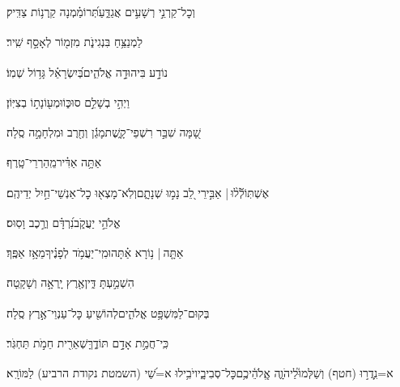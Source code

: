 \documentclass[12pt]{article}
\newcommand{\loc}[1]{\textsuperscript{\locf{#1}}}
\begin{document}
{\loc{ יא}~}‏וְכׇל־קַרְנֵ֣י רְשָׁעִ֣ים אֲגַדֵּ֑עַ{\hfill}תְּ֝רוֹמַ֗מְנָה קַֽרְנ֥וֹת צַדִּֽיק׃\par\pend
\ledpb
\pstart[\subsection*{\textcolor{red}{פרק עו}}]\label{פרק עו}
{\loc{ א}~}‏לַמְנַצֵּ֥חַ בִּנְגִינֹ֑ת מִזְמ֖וֹר לְאָסָ֣ף שִֽׁיר׃\par

{\loc{ ב}~}‏נוֹדָ֣ע בִּיהוּדָ֣ה אֱלֹהִ֑ים{\hfill}בְּ֝יִשְׂרָאֵ֗ל גָּד֥וֹל שְׁמֽוֹ׃\par

{\loc{ ג}~}‏וַיְהִ֣י בְשָׁלֵ֣ם סוּכּ֑וֹ{\hfill}וּמְע֖וֹנָת֣וֹ בְצִיּֽוֹן׃\par

{\loc{ ד}~}‏שָׁ֭מָּה שִׁבַּ֣ר רִשְׁפֵי־קָ֑שֶׁת{\hfill}מָגֵ֬ן וְחֶ֖רֶב וּמִלְחָמָ֣ה סֶֽלָה׃\par

{\loc{ ה}~}‏ אַתָּ֥ה אַדִּ֗יר{\hfill}מֵֽהַרְרֵי־טָֽרֶף׃\par

{\loc{ ו}~}‏אֶשְׁתּֽוֹלְﬞל֨וּ |  אַבִּ֣ירֵי לֵ֭ב נָמ֣וּ שְׁנָתָ֑ם{\hfill}וְלֹֽא־מָצְא֖וּ כׇל־אַנְשֵׁי־חַ֣יִל יְדֵיהֶֽם׃\par

{\loc{ ז}~}‏ אֱלֹהֵ֣י יַעֲקֹ֑ב{\hfill}נִ֝רְדָּ֗ם וְרֶ֣כֶב וָסֽוּס׃\par

{\loc{ ח}~}‏אַתָּ֤ה | {\hfill}נ֥וֹרָא אַ֗תָּה\newline\hspace*{.5em}וּמִֽי־יַעֲמֹ֥ד לְפָנֶ֗יךָ{\hfill}מֵאָ֥ז אַפֶּֽךָ׃\par

{\loc{ ט}~}‏ הִשְׁמַ֣עְתָּ דִּ֑ין{\hfill}אֶ֖רֶץ יָֽרְאָ֣ה וְשָׁקָֽטָה׃\par

{\loc{ י}~}‏בְּקוּם־לַמִּשְׁפָּ֥ט אֱלֹהִ֑ים{\hfill}לְהוֹשִׁ֖יעַ כׇּל־עַנְוֵי־אֶ֣רֶץ סֶֽלָה׃\par

{\loc{ יא}~}‏כִּֽי־חֲמַ֣ת אָדָ֣ם תּוֹדֶ֑ךָּ{\hfill}שְׁאֵרִ֖ית חֵמֹ֣ת תַּחְגֹּֽר׃\par

{\loc{ יב}~}‏א=נִ֥דֲר֣וּ (חטף) וְשַׁלְּמוּ֮{\hfill}לַיהֹוָ֢ה אֱֽלֹהֵ֫יכֶ֥ם\newline\hspace*{.5em}כׇּל־סְבִיבָ֑יו{\hfill}יֹבִ֥ילוּ א=שַׁ֝י (השמטת נקודת הרביע) לַמּוֹרָֽא׃\par
\end{document}
